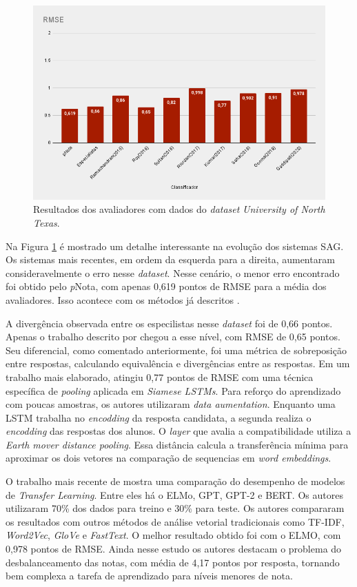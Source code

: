\begin{figure}[!h]
\centering
\includegraphics[width=.6\textwidth]{figuras/UNT/res-unt-rmse.png}
\caption{Resultados dos avaliadores com dados do \textit{dataset} \textit{University of North Texas}.}
\label{fig-UNT}
\end{figure}


Na Figura \ref{fig-UNT} é mostrado um detalhe interessante na evolução dos sistemas SAG. Os sistemas mais recentes, em ordem da esquerda para a direita, aumentaram consideravelmente o erro nesse \textit{dataset}. Nesse cenário, o menor erro encontrado foi obtido pelo \textit{p}Nota, com apenas 0,619 pontos de RMSE para a média dos avaliadores. Isso acontece com os métodos já descritos \cite{riordan2017, saha2018, gomaa2019, ramachandran2015b}. 

A divergência observada entre os especilistas nesse \textit{dataset} foi de 0,66 pontos. Apenas o trabalho descrito por \cite{roy2016} chegou a esse nível, com RMSE de 0,65 pontos. Seu diferencial, como comentado anteriormente, foi uma métrica de sobreposição entre respostas, calculando equivalência e divergências entre as respostas. Em um trabalho mais elaborado, \cite{kumar2017} atingiu 0,77 pontos de RMSE com uma técnica específica de \textit{pooling} aplicada em \textit{Siamese LSTMs}. Para reforço do aprendizado com poucas amostras, os autores utilizaram \textit{data aumentation}. Enquanto uma LSTM trabalha no \textit{encodding} da resposta candidata, a segunda realiza o \textit{encodding} das respostas dos alunos. O \textit{layer} que avalia a compatibilidade utiliza a \textit{Earth mover distance pooling}. Essa distância calcula a transferência mínima para aproximar os dois vetores na comparação de sequencias em \textit{word embeddings}.

O trabalho mais recente de \cite{gaddipati2020} mostra uma comparação do desempenho de modelos de \textit{Transfer Learning}. Entre eles há o ELMo, GPT, GPT-2 e BERT. Os autores utilizaram 70\% dos dados para treino e 30\% para teste. Os autores compararam os resultados com outros métodos de análise vetorial tradicionais como TF-IDF, \textit{Word2Vec}, \textit{GloVe} e \textit{FastText}. O melhor resultado obtido foi com o ELMO, com 0,978 pontos de RMSE. Ainda nesse estudo os autores destacam o problema do desbalanceamento das notas, com média de 4,17 pontos por resposta, tornando bem complexa a tarefa de aprendizado para níveis menores de nota.

